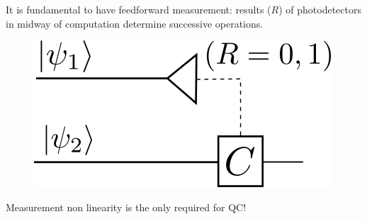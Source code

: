 \documentclass{beamer}
\begin{document}
\begin{frame}
\begin{center}

It is fundamental to have feedforward measurement: results ($R$) of photodetectors in midway of computation determine successive operations.

\begin{figure}[!htb]
\centering
\includegraphics[scale=.5]{immagini/feedforward.png}
\end{figure}

\begin{block}{}
\begin{center}
Measurement non linearity is the only required for QC!
\end{center}
\end{block}

\end{center}
\end{frame}
\end{document}
